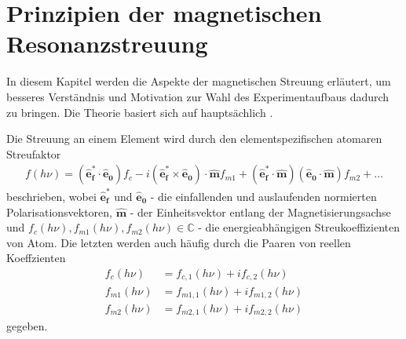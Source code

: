 \chapter{Prinzipien der magnetischen Resonanzstreuung}
\label{text:streuung}
In diesem Kapitel werden die Aspekte der magnetischen Streuung erläutert, um besseres Verständnis und Motivation zur Wahl des Experimentaufbaus dadurch zu bringen. Die Theorie basiert sich auf hauptsächlich \cite{kortright_resonant_2013}. 


\noindent
Die Streuung an einem Element wird durch den elementspezifischen atomaren Streufaktor
\begin{align}
f(h\nu) = (\mathbf{\hat{e}_f^*} \cdot \mathbf{\hat{e}_0})f_c - i(\mathbf{\hat{e}_f^*} \times \mathbf{\hat{e}_0})\cdot\mathbf{\hat{m}}f_{m1}+(\mathbf{\hat{e}_f^*} \cdot \mathbf{\hat{m}})(\mathbf{\hat{e}_0}\cdot\mathbf{\hat{m}})f_{m2} + \dots
\label{eq:atomfaktoren}
\end{align}
beschrieben, wobei $\mathbf{\hat{e}_f^*}$ und $\mathbf{\hat{e}_0}$ - die einfallenden und auslaufenden normierten Polarisationsvektoren, $\mathbf{\hat{m}}$ - der Einheitsvektor entlang der Magnetisierungsachse und $f_c(h\nu), f_{m1}(h\nu), f_{m2}(h\nu) \in \mathbb{C}$ - die energieabhängigen Streukoeffizienten von Atom. Die letzten werden auch häufig durch die Paaren von reellen Koeffzienten
\begin{equation}
    \begin{split}
    f_c(h\nu) &= f_{c,1}(h\nu) + if_{c,2}(h\nu)\\
    f_{m1}(h\nu) &= f_{m1,1}(h\nu) + if_{m1,2}(h\nu)\\
    f_{m2}(h\nu) &= f_{m2,1}(h\nu) + if_{m2,2}(h\nu)
\end{split}
\label{eq:komplex_paar}
\end{equation}
gegeben.

